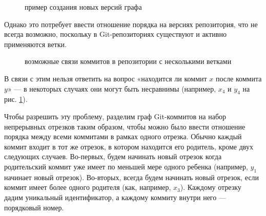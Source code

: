 \begin{figure}[H]
    \caption{пример создания новых версий графа}
\end{figure}

Однако это потребует ввести отношение порядка на версиях репозитория, что не всегда возможно, поскольку в Git-репозиториях существуют и активно применяются ветки.

\begin{figure}[H]
    \centering
    \caption{возможные связи коммитов в репозитории с несколькими ветками}
    \label{fig:multicommits}
\end{figure}

В связи с этим нельзя ответить на вопрос «находится ли коммит $x$ после коммита $y$» — в некоторых случаях они могут быть несравнимы (например, $x_4$ и $y_4$ на рис. \ref{fig:multicommits}).

Чтобы разрешить эту проблему, разделим граф Git-коммитов на набор непрерывных отрезков таким образом, чтобы можно было ввести отношение порядка между всеми коммитами в рамках одного отрезка. Обычно каждый коммит входит в тот же отрезок, в котором находится его родитель, кроме двух следующих случаев. Во-первых, будем начинать новый отрезок когда родительский коммит уже имеет по меньшей мере одного ребенка (например, $y_1$ начинает новый отрезок). Во-вторых, всегда будем начинать новый отрезок, если коммит имеет более одного родителя (как, например, $x_3$). Каждому отрезку дадим уникальный идентификатор, а каждому коммиту внутри него — порядковый номер.

